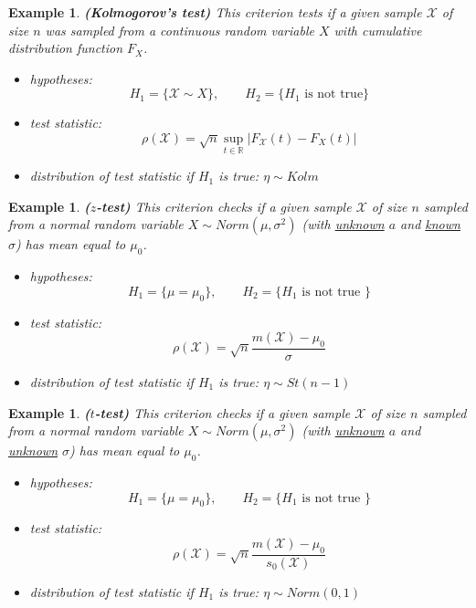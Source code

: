 \documentclass[12pt]{article}
\newtheorem{example}[theorem]{Example}
\begin{document}
\begin{example} \textbf{(Kolmogorov's test)} This criterion tests if a given
    sample $\mathscr{X}$ of size $n$ was sampled from a continuous random
    variable $X$ with cumulative distribution function $F_X$.
    \begin{itemize}
        \item hypotheses:
              $$H_1=\{\mathscr{X}\sim X\},\quad\quad H_2=\{H_1\mbox{ is not
                      true}\}$$
        \item test statistic:
              $$\rho(\mathscr{X})
                  =\sqrt{n}\sup_{t\in\mathbb{R}}|F_{\mathscr{X}}(t)-F_X(t)|$$
        \item distribution of test statistic if $H_1$ is true: $\eta\sim Kolm$
    \end{itemize}
\end{example}

\begin{example} \textbf{($z$-test)} This criterion checks if a given sample
    $\mathscr{X}$ of size $n$ sampled from a normal random variable $X\sim
        Norm(\mu,\sigma^2)$ (with \underline{unknown} $a$ and \underline{known}
    $\sigma$) has mean equal to $\mu_0$.
    \begin{itemize}
        \item hypotheses:
              $$H_1=\{\mu=\mu_0\},\quad\quad H_2=\{H_1\mbox{ is not true }\}$$
        \item test statistic:
              $$\rho(\mathscr{X})=\sqrt{n}\frac{m(\mathscr{X})-\mu_0}{\sigma}$$
        \item distribution of test statistic if $H_1$ is true: $\eta\sim
                  St(n-1)$
    \end{itemize}
\end{example}

\begin{example} \textbf{($t$-test)} This criterion checks if a given sample
    $\mathscr{X}$ of size $n$ sampled from a normal random variable
    $X\sim Norm(\mu,\sigma^2)$ (with \underline{unknown} $a$ and
    \underline{unknown} $\sigma$) has mean equal to $\mu_0$.
    \begin{itemize}
        \item hypotheses:
              $$H_1=\{\mu=\mu_0\},\quad\quad H_2=\{H_1\mbox{ is not true }\}$$
        \item test statistic:
              $$\rho(\mathscr{X})
                  =\sqrt{n}\frac{m(\mathscr{X})-\mu_0}{s_0(\mathscr{X})}$$
        \item distribution of test statistic if $H_1$ is true: $\eta\sim
                  Norm(0,1)$
    \end{itemize}
\end{example}
\end{document}
